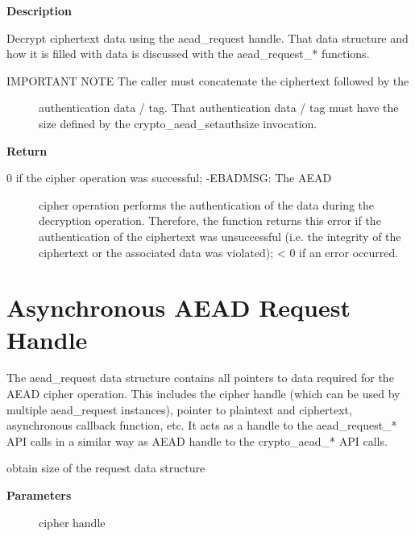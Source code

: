 \documentclass[a4paper,8pt,english]{sphinxmanual}
\begin{document}
\textbf{Description}

Decrypt ciphertext data using the aead\_request handle. That data structure
and how it is filled with data is discussed with the aead\_request\_*
functions.
\begin{description}
\item[{IMPORTANT NOTE The caller must concatenate the ciphertext followed by the}] \leavevmode
authentication data / tag. That authentication data / tag
must have the size defined by the crypto\_aead\_setauthsize
invocation.

\end{description}

\textbf{Return}
\begin{description}
\item[{0 if the cipher operation was successful; -EBADMSG: The AEAD}] \leavevmode
cipher operation performs the authentication of the data during the
decryption operation. Therefore, the function returns this error if
the authentication of the ciphertext was unsuccessful (i.e. the
integrity of the ciphertext or the associated data was violated);
\textless{} 0 if an error occurred.

\end{description}


\section{Asynchronous AEAD Request Handle}
\label{crypto/api-aead:asynchronous-aead-request-handle}
The aead\_request data structure contains all pointers to data required for
the AEAD cipher operation. This includes the cipher handle (which can be
used by multiple aead\_request instances), pointer to plaintext and
ciphertext, asynchronous callback function, etc. It acts as a handle to the
aead\_request\_* API calls in a similar way as AEAD handle to the
crypto\_aead\_* API calls.

\begin{fulllineitems}
\label{crypto/api-aead:c.crypto_aead_reqsize}
obtain size of the request data structure

\end{fulllineitems}


\textbf{Parameters}
\begin{description}
\item[{}] \leavevmode
cipher handle

\end{description}
\end{document}
